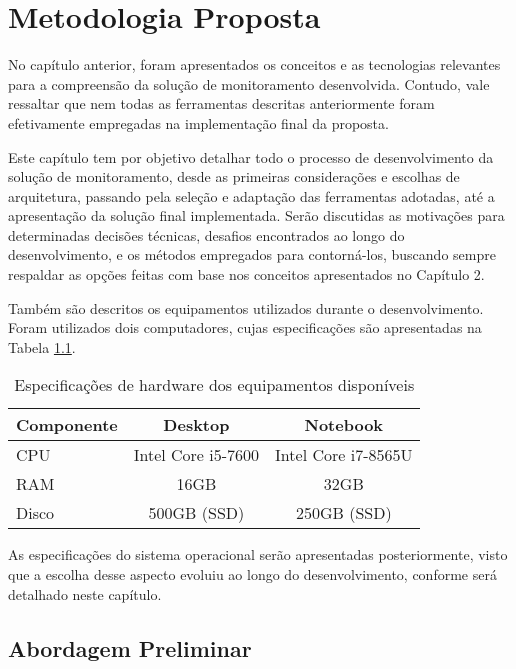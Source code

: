 \chapter{Metodologia Proposta}
\label{chap3}

{\color{red}
No capítulo anterior, foram apresentados os conceitos e as tecnologias relevantes para a compreensão da solução de monitoramento desenvolvida. Contudo, vale ressaltar que nem todas as ferramentas descritas anteriormente foram efetivamente empregadas na implementação final da proposta.

Este capítulo tem por objetivo detalhar todo o processo de desenvolvimento da solução de monitoramento, desde as primeiras considerações e escolhas de arquitetura, passando pela seleção e adaptação das ferramentas adotadas, até a apresentação da solução final implementada. Serão discutidas as motivações para determinadas decisões técnicas, desafios encontrados ao longo do desenvolvimento, e os métodos empregados para contorná-los, buscando sempre respaldar as opções feitas com base nos conceitos apresentados no Capítulo 2.

Também são descritos os equipamentos utilizados durante o desenvolvimento. Foram utilizados dois computadores, cujas especificações são apresentadas na Tabela \ref{tab:available-hardware}.


\begin{table}[H]
\centering
{\color{red}
\caption{Especificações de hardware dos equipamentos disponíveis}
\label{tab:available-hardware}
\begin{tabular}{lcc}
\toprule
\textbf{Componente} & \textbf{Desktop} & \textbf{Notebook} \\
\midrule
CPU   & Intel Core i5-7600   & Intel Core i7-8565U \\
RAM   & 16GB                 & 32GB                \\
Disco & 500GB (SSD)            & 250GB (SSD)          \\
\bottomrule
\end{tabular}
}
\end{table}

As especificações do sistema operacional serão apresentadas posteriormente, visto que a escolha desse aspecto evoluiu ao longo do desenvolvimento, conforme será detalhado neste capítulo.

\section{Abordagem Preliminar}
\label{section:AbordagemPreliminar}

}
